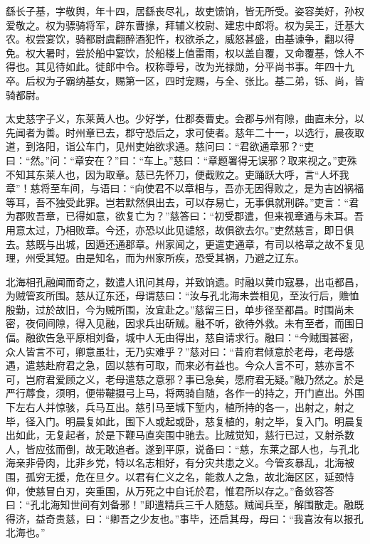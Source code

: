 \documentclass[12pt,UTF8]{ctexbook}
\begin{document}
繇长子基，字敬舆，年十四，居繇丧尽礼，故吏馈饷，皆无所受。姿容美好，孙权爱敬之。权为骠骑将军，辟东曹掾，拜辅义校尉、建忠中郎将。权为吴王，迁基大农。权尝宴饮，骑都尉虞翻醉酒犯忤，权欲杀之，威怒甚盛，由基谏争，翻以得免。权大暑时，尝於船中宴饮，於船楼上值雷雨，权以盖自覆，又命覆基，馀人不得也。其见待如此。徙郎中令。权称尊号，改为光禄勋，分平尚书事。年四十九卒。后权为子霸纳基女，赐第一区，四时宠赐，与全、张比。基二弟，铄、尚，皆骑都尉。

太史慈字子义，东莱黄人也。少好学，仕郡奏曹史。会郡与州有隙，曲直未分，以先闻者为善。时州章已去，郡守恐后之，求可使者。慈年二十一，以选行，晨夜取道，到洛阳，诣公车门，见州吏始欲求通。慈问曰：“君欲通章邪？“吏曰：“然。”问：“章安在？”曰：“车上。”慈曰：“章题署得无误邪？取来视之。”吏殊不知其东莱人也，因为取章。慈已先怀刀，便截败之。吏踊跃大呼，言“人坏我章”！慈将至车间，与语曰：“向使君不以章相与，吾亦无因得败之，是为吉凶祸福等耳，吾不独受此罪。岂若默然俱出去，可以存易亡，无事俱就刑辟。”吏言：“君为郡败吾章，已得如意，欲复亡为？”慈答曰：“初受郡遣，但来视章通与未耳。吾用意太过，乃相败章。今还，亦恐以此见谴怒，故俱欲去尔。”吏然慈言，即日俱去。慈既与出城，因遁还通郡章。州家闻之，更遣吏通章，有司以格章之故不复见理，州受其短。由是知名，而为州家所疾，恐受其祸，乃避之辽东。

北海相孔融闻而奇之，数遣人讯问其母，并致饷遗。时融以黄巾寇暴，出屯都昌，为贼管亥所围。慈从辽东还，母谓慈曰：“汝与孔北海未尝相见，至汝行后，赡恤殷勤，过於故旧，今为贼所围，汝宜赴之。”慈留三日，单步径至都昌。时围尚未密，夜伺间隙，得入见融，因求兵出斫贼。融不听，欲待外救。未有至者，而围日偪。融欲告急平原相刘备，城中人无由得出，慈自请求行。融曰：“今贼围甚密，众人皆言不可，卿意虽壮，无乃实难乎？”慈对曰：“昔府君倾意於老母，老母感遇，遣慈赴府君之急，固以慈有可取，而来必有益也。今众人言不可，慈亦言不可，岂府君爱顾之义，老母遣慈之意邪？事已急矣，愿府君无疑。”融乃然之。於是严行蓐食，须明，便带鞬摄弓上马，将两骑自随，各作一的持之，开门直出。外围下左右人并惊骇，兵马互出。慈引马至城下堑内，植所持的各一，出射之，射之毕，径入门。明晨复如此，围下人或起或卧，慈复植的，射之毕，复入门。明晨复出如此，无复起者，於是下鞭马直突围中驰去。比贼觉知，慈行已过，又射杀数人，皆应弦而倒，故无敢追者。遂到平原，说备曰：“慈，东莱之鄙人也，与孔北海亲非骨肉，比非乡党，特以名志相好，有分灾共患之义。今管亥暴乱，北海被围，孤穷无援，危在旦夕。以君有仁义之名，能救人之急，故北海区区，延颈恃仰，使慈冒白刃，突重围，从万死之中自讬於君，惟君所以存之。”备敛容答曰：“孔北海知世间有刘备邪！”即遣精兵三千人随慈。贼闻兵至，解围散走。融既得济，益奇贵慈，曰：“卿吾之少友也。”事毕，还启其母，母曰：“我喜汝有以报孔北海也。”
\end{document}
